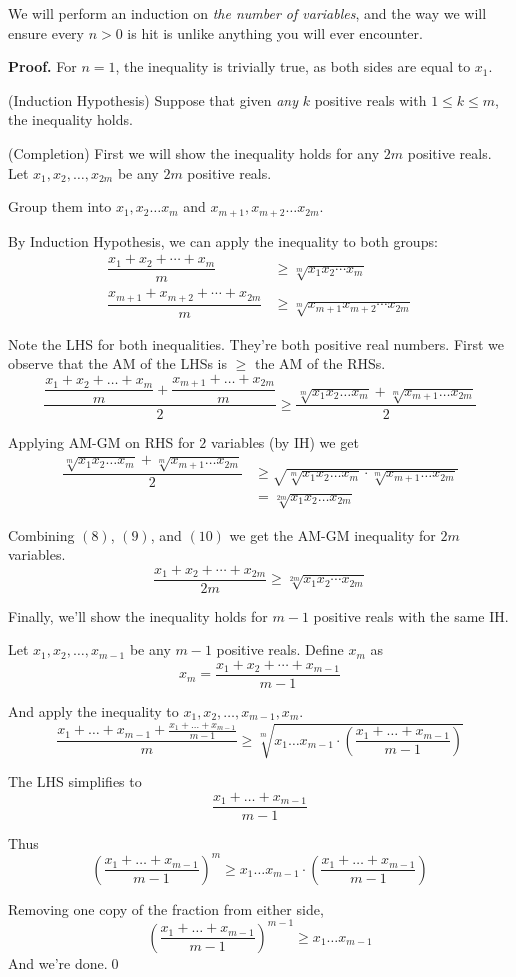 We will perform an induction on \textit{the number of variables}, and the way we will ensure every $n > 0$ is hit is unlike anything you will ever encounter.
\begin{smrg}\textbf{Proof.} For $n = 1$, the inequality is trivially true, as both sides are equal to $x_1$.

(Induction Hypothesis) Suppose that given \textit{any} $k$ positive reals with $1 \leq k \leq m$, the inequality holds.

(Completion) First we will show the inequality holds for any $2m$ positive reals. Let $x_1, x_2, \ldots, x_{2m}$ be any $2m$ positive reals.

Group them into $x_1, x_2 \ldots x_m$ and $x_{m+1}, x_{m+2} \ldots x_{2m}$.

By Induction Hypothesis, we can apply the inequality to both groups:
\begin{align}
\dfrac{x_1 + x_2 + \cdots + x_m}{m} &\geq \sqrt[m]{x_1 x_2 \cdots x_m} \\
\dfrac{x_{m+1} + x_{m+2} + \cdots + x_{2m}}{m} &\geq \sqrt[m]{x_{m+1} x_{m+2} \cdots x_{2m}}
\end{align}

Note the LHS for both inequalities. They're both positive real numbers. First we observe that the AM of the LHSs is $\ge$ the AM of the RHSs.
\begin{equation}
\dfrac{\dfrac{x_1 + x_2 + \ldots + x_m}{m} + \dfrac{x_{m+1} + \ldots + x_{2m}}{m}}{2} \geq \dfrac{\sqrt[m]{x_1 x_2 \ldots x_m} + \sqrt[m]{x_{m+1} \ldots x_{2m}}}{2}
\end{equation}

Applying AM-GM on RHS for $2$ variables (by IH) we get
\begin{align}
\dfrac{\sqrt[m]{x_1 x_2 \ldots x_m} + \sqrt[m]{x_{m+1} \ldots x_{2m}}}{2} &\geq \sqrt{\sqrt[m]{x_1 x_2 \ldots x_m}\cdot\sqrt[m]{x_{m+1} \ldots x_{2m}}}\\
&= \sqrt[2m]{x_1x_2\ldots x_{2m}}
\end{align}

Combining $(8)$, $(9)$, and $(10)$ we get the AM-GM inequality for $2m$ variables.
\[
\dfrac{x_1 + x_2 + \cdots + x_{2m}}{2m} \geq \sqrt[2m]{x_1 x_2 \cdots x_{2m}}
\]

Finally, we'll show the inequality holds for $m - 1$ positive reals with the same IH.

Let $x_1, x_2, \ldots, x_{m-1}$ be any $m - 1$ positive reals. Define $x_m$ as
\[
x_m = \dfrac{x_1 + x_2 + \cdots + x_{m-1}}{m - 1}
\]

And apply the inequality to $x_1, x_2, \ldots, x_{m-1}, x_m$.
\[
\dfrac{x_1 + \dots + x_{m-1} + \frac{x_1 + \dots + x_{m-1}}{m-1}}{m} \geq \sqrt[m]{x_1 \dots x_{m-1} \cdot \left(\frac{x_1 + \dots + x_{m-1}}{m-1}\right)}
\]

The LHS simplifies to
\[
\dfrac{x_1 + \dots + x_{m-1}}{m - 1}
\]

Thus
\[
\left(\dfrac{x_1 + \dots + x_{m-1}}{m-1}\right)^m \geq x_1\dots x_{m-1}\cdot\left(\frac{x_1+\dots+x_{m-1}}{m-1}\right)
\]

Removing one copy of the fraction from either side,
\[
\left(\dfrac{x_1 + \dots + x_{m-1}}{m-1}\right)^{m-1} \geq x_1\dots x_{m-1}
\]
And we're done.\qed
\end{smrg}
